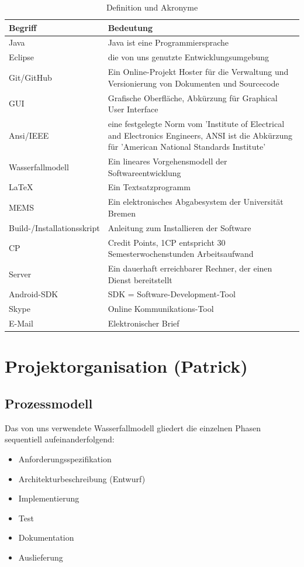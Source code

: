 \documentclass[fontsize=12pt,paper=a4,twoside]{scrartcl}
\begin{document}
\begin{table}[htbp]
\caption{Definition und Akronyme}
\centering
\begin{tabular}{p{7cm}|p{7cm}}
\hline Begriff & Bedeutung\\ \hline
\hline Java & Java ist eine Programmiersprache\\
\hline Eclipse & die von uns genutzte Entwicklungsumgebung\\
\hline Git/GitHub & Ein Online-Projekt Hoster für die Verwaltung und Versionierung von Dokumenten und Sourcecode\\
\hline GUI & Grafische Oberfläche, Abkürzung für Graphical User Interface\\
\hline Ansi/IEEE & eine festgelegte Norm vom 'Institute of Electrical and Electronics Engineers, ANSI ist die Abkürzung für 'American National Standards Institute'\\
\hline Wasserfallmodell & Ein lineares Vorgehensmodell der Softwareentwicklung\\
\hline \LaTeX & Ein Textsatzprogramm\\
\hline MEMS & Ein elektronisches Abgabesystem der Universität Bremen\\
\hline Build-/Installationsskript & Anleitung zum Installieren der Software\\
\hline CP & Credit Points, 1CP entspricht 30 Semesterwochenstunden Arbeitsaufwand\\
\hline Server & Ein dauerhaft erreichbarer Rechner, der einen Dienst bereitstellt\\
\hline Android-SDK & SDK = Software-Development-Tool\\
\hline Skype & Online Kommunikations-Tool\\
\hline E-Mail & Elektronischer Brief\\
\hline 
\hline
\end{tabular}
\end{table}

\newpage

\section{Projektorganisation (Patrick)}

\subsection{Prozessmodell}
\label{sec:prozessmodell}

Das von uns verwendete Wasserfallmodell gliedert die einzelnen Phasen sequentiell aufeinanderfolgend:\\
\begin{itemize}

\item Anforderungsspezifikation
\item Architekturbeschreibung (Entwurf)
\item Implementierung
\item Test
\item Dokumentation
\item Auslieferung
\end{itemize}
\end{document}
